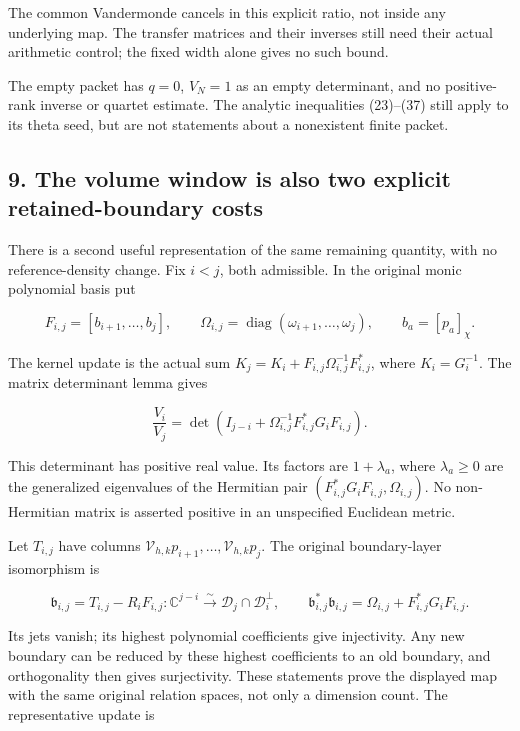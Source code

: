 The common Vandermonde cancels in this explicit ratio, not inside any underlying map. The transfer matrices and their inverses still need their actual arithmetic control; the fixed width alone gives no such bound.

The empty packet has \(q=0\), \(V_N=1\) as an empty determinant, and no positive-rank inverse or quartet estimate. The analytic inequalities (23)--(37) still apply to its theta seed, but are not statements about a nonexistent finite packet.

\subsection{9. The volume window is also two explicit retained-boundary costs}\label{zlm:endpoint-arithmetic_original--the-volume-window-is-also-two-explicit-retained-boundary-costs}

There is a second useful representation of the same remaining quantity, with no reference-density change. Fix \(i<j\), both admissible. In the original monic polynomial basis put

\[
 F_{i,j}=[b_{i+1},\ldots,b_j],\qquad
 \Omega_{i,j}=\operatorname{diag}(\omega_{i+1},\ldots,\omega_j),
 \qquad b_a=[p_a]_\chi.                                                 \tag{43}
\]

The kernel update is the actual sum \(K_j=K_i+F_{i,j}\Omega_{i,j}^{-1}F_{i,j}^*\), where \(K_i=G_i^{-1}\). The matrix determinant lemma gives

\[
 \boxed{\frac{V_i}{V_j}
 =\det\!\left(I_{j-i}+\Omega_{i,j}^{-1}F_{i,j}^*G_iF_{i,j}\right).}       \tag{44}
\]

This determinant has positive real value. Its factors are \(1+\lambda_a\), where \(\lambda_a\ge0\) are the generalized eigenvalues of the Hermitian pair \((F_{i,j}^*G_iF_{i,j},\Omega_{i,j})\). No non-Hermitian matrix is asserted positive in an unspecified Euclidean metric.

Let \(T_{i,j}\) have columns \(\mathcal V_{h,k}p_{i+1},\ldots,
\mathcal V_{h,k}p_j\). The original boundary-layer isomorphism is

\[
 \mathfrak b_{i,j}=T_{i,j}-R_iF_{i,j}:
 \mathbb C^{j-i}\xrightarrow{\sim}
 \mathcal D_j\cap\mathcal D_i^\perp,
 \qquad
 \mathfrak b_{i,j}^*\mathfrak b_{i,j}
 =\Omega_{i,j}+F_{i,j}^*G_iF_{i,j}.                                     \tag{45}
\]

Its jets vanish; its highest polynomial coefficients give injectivity. Any new boundary can be reduced by these highest coefficients to an old boundary, and orthogonality then gives surjectivity. These statements prove the displayed map with the same original relation spaces, not only a dimension count. The representative update is

